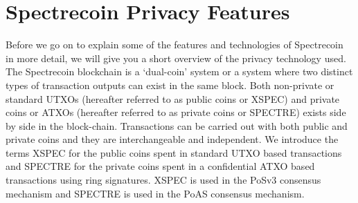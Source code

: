 \chapter{Spectrecoin Privacy Features}
Before we go on to explain some of the features and technologies of
Spectrecoin in more detail, we will give you a short overview of the
privacy technology used. The Spectrecoin blockchain is a ‘dual-coin’
system or a system where two distinct types of transaction outputs can
exist in the same block. Both non-private or standard UTXOs (hereafter
referred to as public coins or XSPEC) and private coins or ATXOs (hereafter
referred to as private coins or SPECTRE) exists side by side in the
block-chain. Transactions can be carried out with both public and private
coins and they are interchangeable and independent. We introduce the terms
XSPEC for the public coins spent in standard UTXO based transactions and
SPECTRE for the private coins spent in a confidential ATXO based
transactions using ring signatures. XSPEC is used in the PoSv3 consensus
mechanism and SPECTRE is used in the PoAS consensus mechanism.
